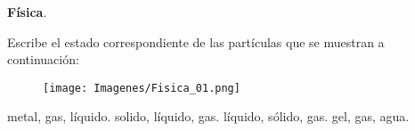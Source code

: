 \documentclass[12pt, letter]{exam}
\begin{document}
\textbf{Física}.
\begin{questions}
     \question Escribe el estado correspondiente de las partículas que se muestran a continuación:
     \begin{figure}[h]
        \centering
        \texttt{[image: Imagenes/Fisica\_01.png]}
     \end{figure}
     \begin{choices}
         \choice metal, gas, líquido.
         \choice solido, líquido, gas.
         \choice líquido, sólido, gas.
         \choice gel, gas, agua.
     \end{choices}
\end{questions}
\end{document}
